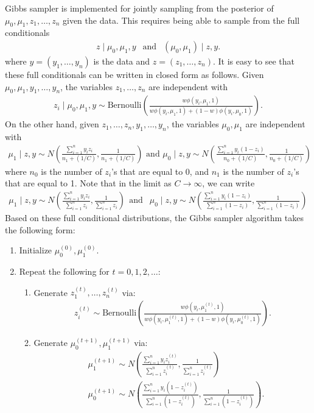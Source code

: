 \documentclass{scrartcl}
\begin{document}
Gibbs sampler is implemented for jointly sampling from the posterior
of $\mu_0, \mu_1, z_1, \dots, z_n$ given the data. This requires being
able to sample from the full conditionals
\begin{align*}
  z \mid \mu_0, \mu_1, y ~~ \text{ and } ~~ (\mu_0, \mu_1) \mid z, y. 
\end{align*}
where $y = (y_1, \dots, y_n)$ is the data and $z = (z_1, \dots,
z_n)$. It is easy to see that these full conditionals can be written
in closed form as follows. Given $\mu_0, \mu_1, y_1, \dots, y_n$, the
variables $z_1, \dots, z_n$ are independent with
\begin{align*}
  z_i \mid \mu_0, \mu_1, y \sim \text{Bernoulli} \left(\frac{w
  \phi(y_i, \mu_1, 1)}{w \phi(y_i, \mu_1, 1) + (1 - w) \phi(y_i,
  \mu_0, 1)}\right). 
\end{align*}
On the other hand, given $z_1, \dots, z_n, y_1, \dots, y_n$, the
variables $\mu_0, \mu_1$  are independent with
\begin{align*}
  \mu_1 \mid z, y \sim N \left(
  \frac{\sum_{i=1}^n y_i z_i}{n_1 + (1/C)}, \frac{1}{n_1 + (1/C)}
  \right) \text{ and } \mu_0 \mid z, y \sim N \left(
  \frac{\sum_{i=1}^n y_i (1-z_i)}{n_0 + (1/C)}, \frac{1}{n_0 + (1/C)}
  \right) 
\end{align*}
where $n_0$ is the number of $z_i$'s that are equal to 0, and $n_1$ is
the number of $z_i$'s that are equal to 1. Note that in the limit as
$C \rightarrow \infty$, we can write 
\begin{align*}
  \mu_1 \mid z, y \sim N \left(\frac{\sum_{i=1}^n y_i
  z_i}{\sum_{i=1}^n z_i}, \frac{1}{\sum_{i=1}^n z_i} \right) ~~ \text{
  and } ~~   \mu_0 \mid z, y \sim N \left(\frac{\sum_{i=1}^n y_i
  (1 - z_i)}{\sum_{i=1}^n (1 -z_i)}, \frac{1}{\sum_{i=1}^n (1 - z_i)} \right)
\end{align*}
Based on these full conditional distributions, the Gibbs sampler
algorithm takes the following form:
\begin{enumerate}
\item Initialize $\mu_0^{(0)}, \mu_1^{(0)}$.
\item Repeat the following for $t = 0, 1, 2, \dots$:
  \begin{enumerate}
  \item Generate $z_1^{(t)}, \dots, z_n^{(t)}$ via:
    \begin{align*}
      z_i^{(t)} \sim \text{Bernoulli} \left(\frac{w
  \phi(y_i, \mu^{(t)}_1, 1)}{w \phi(y_i, \mu^{(t)}_1, 1) + (1 - w) \phi(y_i,
  \mu^{(t)}_0, 1)}\right). 
    \end{align*}
  \item Generate $\mu_0^{(t+1)}, \mu_1^{(t+1)}$ via:
\begin{align*}
&  \mu^{(t+1)}_1  \sim N \left(\frac{\sum_{i=1}^n y_i
  z^{(t)}_i}{\sum_{i=1}^n z^{(t)}_i}, \frac{1}{\sum_{i=1}^n z^{(t)}_i}
  \right) \\ & \mu^{(t+1)}_0  \sim N \left(\frac{\sum_{i=1}^n y_i
  (1 - z^{(t)}_i)}{\sum_{i=1}^n (1 -z^{(t)}_i)}, \frac{1}{\sum_{i=1}^n
  (1 - z^{(t)}_i)} \right).
\end{align*}    
  \end{enumerate}
\end{enumerate}
\end{document}
